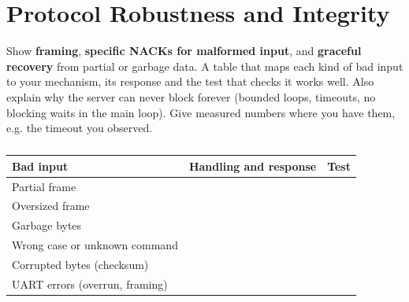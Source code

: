 \section{Protocol Robustness and Integrity}
\label{sec:robust}

\begin{guidance}
Show \textbf{framing}, \textbf{specific NACKs for malformed input}, and
\textbf{graceful recovery} from partial or garbage data. A table that maps each
kind of bad input to your mechanism, its response and the test that checks it
works well. Also explain why the server can never block forever (bounded
loops, timeouts, no blocking waits in the main loop). Give measured numbers
where you have them, e.g. the timeout you observed.
\end{guidance}


\begin{table}[t]
\centering
\caption{}
\label{tab:threats}
\scriptsize
\begin{tabular}{@{}L{1.7cm}L{3.1cm}L{3.2cm}@{}}
\toprule
Bad input & Handling and response & Test \\
\midrule
Partial frame & \ph{\ldots} & \ph{\ldots} \\
Oversized frame & \ph{\ldots} & \ph{\ldots} \\
Garbage bytes & \ph{\ldots} & \ph{\ldots} \\
Wrong case or unknown command & \ph{\ldots} & \ph{\ldots} \\
Corrupted bytes (checksum) & \ph{\ldots} & \ph{\ldots} \\
UART errors (overrun, framing) & \ph{\ldots} & \ph{\ldots} \\
\bottomrule
\end{tabular}
\end{table}

\subsection{}

\subsection{}

\subsection{}
